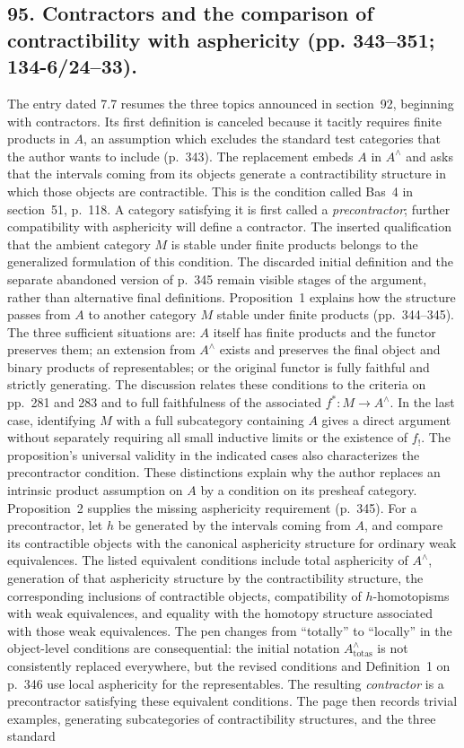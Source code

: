 \documentclass[10pt,oneside]{book}
\begin{document}
\subsection*{95. Contractors and the comparison of contractibility with asphericity (pp. 343--351; 134-6/24--33).}
The entry dated 7.7 resumes the three topics announced in section~92, beginning with contractors. Its first definition is canceled because it tacitly requires finite products in $A$, an assumption which excludes the standard test categories that the author wants to include (p.~343). The replacement embeds $A$ in $A^{\wedge}$ and asks that the intervals coming from its objects generate a contractibility structure in which those objects are contractible. This is the condition called Bas~4 in section~51, p.~118. A category satisfying it is first called a \emph{precontractor}; further compatibility with asphericity will define a contractor. The inserted qualification that the ambient category $M$ is stable under finite products belongs to the generalized formulation of this condition. The discarded initial definition and the separate abandoned version of p.~345 remain visible stages of the argument, rather than alternative final definitions. Proposition~1 explains how the structure passes from $A$ to another category $M$ stable under finite products (pp.~344--345). The three sufficient situations are: $A$ itself has finite products and the functor preserves them; an extension from $A^{\wedge}$ exists and preserves the final object and binary products of representables; or the original functor is fully faithful and strictly generating. The discussion relates these conditions to the criteria on pp.~281 and 283 and to full faithfulness of the associated $f^*:M\to A^{\wedge}$. In the last case, identifying $M$ with a full subcategory containing $A$ gives a direct argument without separately requiring all small inductive limits or the existence of $f_!$. The proposition's universal validity in the indicated cases also characterizes the precontractor condition. These distinctions explain why the author replaces an intrinsic product assumption on $A$ by a condition on its presheaf category. Proposition~2 supplies the missing asphericity requirement (p.~345). For a precontractor, let $h$ be generated by the intervals coming from $A$, and compare its contractible objects with the canonical asphericity structure for ordinary weak equivalences. The listed equivalent conditions include total asphericity of $A^{\wedge}$, generation of that asphericity structure by the contractibility structure, the corresponding inclusions of contractible objects, compatibility of $h$-homotopisms with weak equivalences, and equality with the homotopy structure associated with those weak equivalences. The pen changes from ``totally'' to ``locally'' in the object-level conditions are consequential: the initial notation $A^{\wedge}_{\mathrm{totas}}$ is not consistently replaced everywhere, but the revised conditions and Definition~1 on p.~346 use local asphericity for the representables. The resulting \emph{contractor} is a precontractor satisfying these equivalent conditions. The page then records trivial examples, generating subcategories of contractibility structures, and the three standard 
\end{document}
